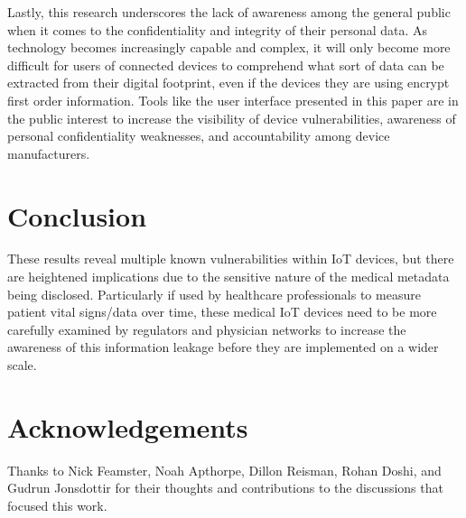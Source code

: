 Lastly, this research underscores the lack of awareness among the general public when it comes to the confidentiality and integrity of their personal data. As technology becomes increasingly capable and complex, it will only become more difficult for users of connected devices to comprehend what sort of data can be extracted from their digital footprint, even if the devices they are using encrypt first order information. Tools like the user interface presented in this paper are in the public interest to increase the visibility of device vulnerabilities, awareness of personal confidentiality weaknesses, and accountability among device manufacturers.


\section{Conclusion}

These results reveal multiple known vulnerabilities within IoT devices, but there are heightened implications due to the sensitive nature of the medical metadata being disclosed. Particularly if used by healthcare professionals to measure patient vital signs/data over time, these medical IoT devices need to be more carefully examined by regulators and physician networks to increase the awareness of this information leakage before they are implemented on a wider scale. 

\appendix

\section*{Acknowledgements}
Thanks to Nick Feamster, Noah Apthorpe, Dillon Reisman, Rohan Doshi, and Gudrun Jonsdottir for their thoughts and contributions to the discussions that focused this work. 
